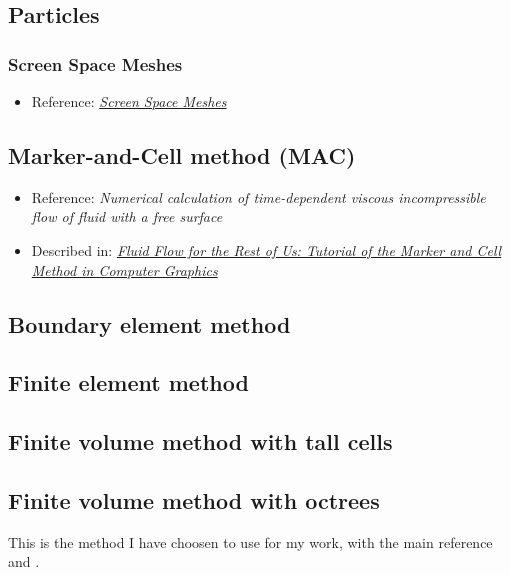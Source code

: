 \subsection{Particles}

\subsubsection{Screen Space Meshes}

\begin{itemize}
    \item Reference: \textit{\href{http://www.matthiasmueller.info/publications/screenSpaceMeshes.pdf}{Screen Space Meshes}}
\end{itemize}

\subsection{Marker-and-Cell method (MAC)}

\begin{itemize}
    \item Reference: \textit{Numerical calculation of time-dependent viscous incompressible flow of fluid with a free surface}
    \item Described in: \textit{\href{http://people.sc.fsu.edu/~jburkardt/pdf/fluid_flow_for_the_rest_of_us.pdf}{Fluid Flow for the Rest of Us: Tutorial of the Marker and Cell Method in Computer Graphics}}
\end{itemize}

\subsection{Boundary element method}

\subsection{Finite element method}

\subsection{Finite volume method with tall cells}

\subsection{Finite volume method with octrees}

This is the method I have choosen to use for my work, with the main reference \citealp{Losasso2004} and \citep{Popinet2003}.

